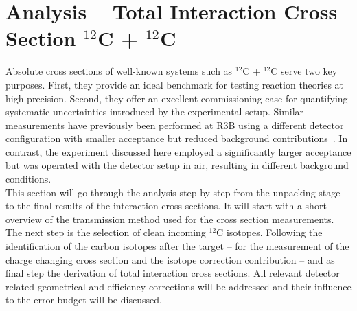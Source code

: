 \section{Analysis -- Total Interaction Cross Section $^{12}$C + $^{12}$C}\label{sec:analysis_cross_sec}
Absolute cross sections of well-known systems such as $^{12}$C + $^{12}$C serve two key purposes. First, they provide an ideal benchmark for testing reaction theories at high precision. Second, they offer an excellent commissioning case for quantifying systematic uncertainties introduced by the experimental setup. Similar measurements have previously been performed at R3B using a different detector configuration with smaller acceptance but reduced background contributions~\cite{ponnath2024measurement,ponnath2023precise}. In contrast, the experiment discussed here employed a significantly larger acceptance but was operated with the detector setup in air, resulting in different background conditions.\\
This section will go through the  analysis step by step from the unpacking stage to the final results of the interaction cross sections. It will start with a short overview of the transmission method used for the cross section measurements. The next step is  the selection of clean incoming $^{12}$C isotopes. Following the identification of the carbon isotopes after the target -- for the measurement of the charge changing cross section and the isotope correction contribution -- and as final step the derivation of total interaction cross sections. \newline
All relevant detector related geometrical and efficiency corrections will be addressed and their influence to the error budget will be discussed.\\

